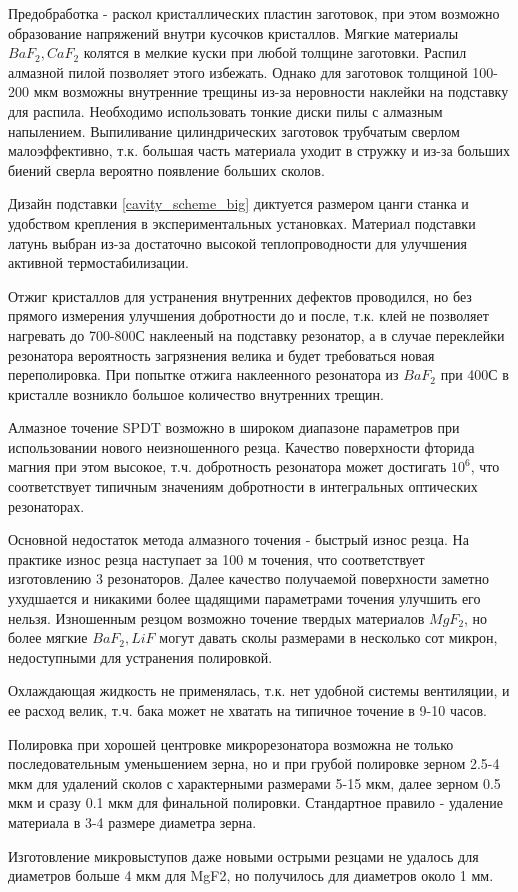 Предобработка - раскол кристаллических пластин заготовок, при этом возможно образование напряжений внутри кусочков кристаллов. Мягкие материалы $BaF_2, CaF_2$ колятся в мелкие куски при любой толщине заготовки. Распил алмазной пилой позволяет этого избежать. Однако для заготовок толщиной 100-200 мкм возможны внутренние трещины из-за неровности наклейки на подставку для распила. Необходимо использовать тонкие диски пилы с алмазным напылением. Выпиливание цилиндрических заготовок трубчатым сверлом малоэффективно, т.к. большая часть материала уходит в стружку и из-за больших биений сверла вероятно появление больших сколов. 

Дизайн подставки \ref{cavity_scheme_big} диктуется размером цанги станка и удобством крепления в экспериментальных установках. Материал подставки латунь выбран из-за достаточно высокой теплопроводности для улучшения активной термостабилизации. 

Отжиг кристаллов для устранения внутренних дефектов проводился, но без прямого измерения улучшения добротности до и после, т.к. клей не позволяет нагревать до 700-800С наклееный на подставку резонатор, а в случае переклейки резонатора вероятность загрязнения велика и будет требоваться новая переполировка. При попытке отжига наклеенного резонатора из $BaF_2$ при 400С в кристалле возникло большое количество внутренних трещин.

Алмазное точение SPDT возможно в широком диапазоне параметров при использовании нового неизношенного резца. Качество поверхности фторида магния при этом высокое, т.ч. добротность резонатора может достигать $10^6$, что соответствует типичным значениям добротности в интегральных оптических резонаторах.

Основной недостаток метода алмазного точения - быстрый износ резца. На практике износ резца наступает за 100 м точения, что соответствует изготовлению 3 резонаторов. Далее качество получаемой поверхности заметно ухудшается и никакими более щадящими параметрами точения улучшить его нельзя. Изношенным резцом возможно точение твердых материалов $MgF_2$, но более мягкие $BaF_2, LiF$ могут давать сколы размерами в несколько сот микрон, недоступными для устранения полировкой. 

Охлаждающая жидкость не применялась, т.к. нет удобной системы вентиляции, и ее расход велик, т.ч. бака может не хватать на типичное точение в 9-10 часов.

Полировка при хорошей центровке микрорезонатора возможна не только последовательным уменьшением зерна, но и при грубой полировке зерном 2.5-4 мкм для удалений сколов с характерными размерами 5-15 мкм, далее зерном 0.5 мкм и сразу 0.1 мкм для финальной полировки. Стандартное правило - удаление материала в 3-4 размере диаметра зерна.

Изготовление микровыступов даже новыми острыми резцами не удалось для диаметров больше 4 мкм для MgF2, но получилось для диаметров около 1 мм. 